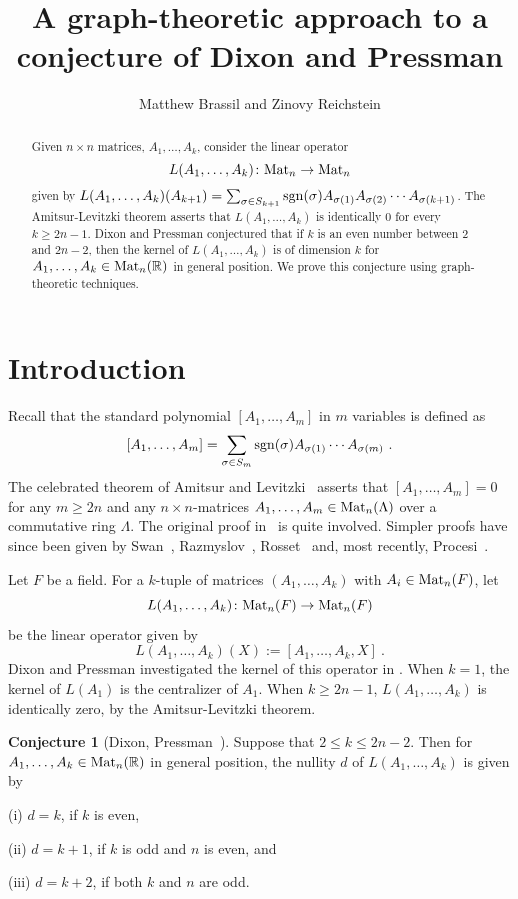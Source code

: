 \documentclass{amsproc}
\title{A graph-theoretic approach to a conjecture of Dixon and Pressman}
\author[Matthew Brassil and Zinovy Reichstein]{Matthew Brassil 
and Zinovy Reichstein}
\theoremstyle{definition}
\newtheorem{conjecture}[theorem]{Conjecture}
\theoremstyle{remark}
\numberwithin{equation}{section}
\newcommand{\R}{{\mathbb R}}
\newcommand{\sgn}{{\rm sgn}}
\newcommand{\M}{{\rm Mat}}
\begin{document}
\begin{abstract} Given $n \times n$ matrices, $A_1, \dots, A_k$, consider the linear operator \[ L(A_1,\dots,A_k) \colon \M_n \to \M_n \] 
given by
$L(A_1,\dots,A_k)(A_{k+1})=\sum_{\sigma\in S_{k+1}}\sgn(\sigma)A_{\sigma(1)}A_{\sigma(2)}\cdots A_{\sigma(k+1)}$. 
The Amitsur-Levitzki theorem asserts that $L(A_1, \ldots, A_k)$ is identically $0$ for every $k \geqslant 2n-1$.
Dixon and Pressman conjectured that if $k$ is an even number between $2$ and $2n - 2$, then
the kernel of $L(A_1, \ldots, A_k)$ is of dimension $k$ for
$A_1,\dots,A_k\in \M_n(\R)$ in general position. We prove this conjecture using graph-theoretic techniques.
\end{abstract}

\maketitle




\section{Introduction}
Recall that the standard polynomial $[A_1,\dots,A_m]$ in $m$ variables is defined as
\[ [A_1,\dots,A_m] = \sum_{\sigma\in S_m} \sgn(\sigma)A_{\sigma(1)}\cdots A_{\sigma(m)}\ .\]
The celebrated theorem of Amitsur and Levitzki~\cite{al} asserts that $[A_1,\dots,A_m] = 0$ 
for any $m \geqslant 2n$ and any $n \times n$-matrices $A_1, \dots, A_m \in \M_n(\Lambda)$ over a commutative ring $\Lambda$.
The original proof in~\cite{al} is quite involved. Simpler proofs have since been given by Swan~\cite{swan, swan2}, Razmyslov~\cite{razmyslov}, Rosset~\cite{rosset} and, most recently, Procesi~\cite{procesi-al}.

Let $F$ be a field. For a $k$-tuple of matrices $(A_1,\dots,A_k)$ with $A_i\in \M_n(F)$, let 
\[ L(A_1,\dots,A_k) \colon \M_n(F) \to \M_n(F) \]
be the linear operator
given by
\[L(A_1,\dots,A_k)(X):=[A_1,\dots,A_k,X]\ .\]
Dixon and Pressman investigated the kernel of this operator in \cite{dp}. When $k=1$, the kernel of $L(A_1)$ is the centralizer of $A_1$. When $k \geqslant  2n-1$, $L(A_1,\dots,A_k)$ is identically zero, by the Amitsur-Levitzki theorem. 

\begin{conjecture}[Dixon, Pressman~\cite{dp}] \label{conj.main}
Suppose that $2\leqslant k\leqslant 2n-2$. Then for $A_1,\dots,A_k\in \M_n(\R)$ in general position, the nullity $d$ of $L(A_1,\dots,A_k)$ 
is given by 

\smallskip
(i) $d=k$, if $k$ is even,

\smallskip
(ii) $d=k+1$, if $k$ is odd and $n$ is even, and 

\smallskip
(iii) $d=k+2$, if both $k$ and $n$ are odd.
\end{conjecture}
\end{document}
